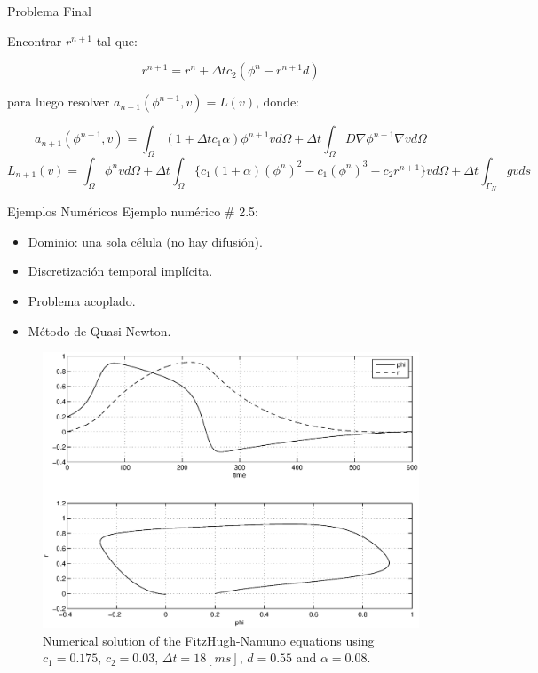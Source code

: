 \documentclass[11pt,spanish]{beamer}
\begin{document}
\begin{frame}{Problema Final}

Encontrar $r^{n+1}$ tal que:

\begin{equation*}
r^{n+1} = r^n + \Delta t c_2 (\phi^n - r^{n+1} d)
\end{equation*}

para luego resolver $a_{n + 1} (\phi^{n + 1}, v) = L(v)$, donde:

\begin{equation*}
a_{n+1} (\phi^{n + 1}, v) = \int_{\Omega} (1 + \Delta t c_1 \alpha) \phi^{n+1} v d \Omega + \Delta t \int_{\Omega} D \nabla \phi^{n+1} \nabla v d \Omega \label{eq:esquema_definitivo}
\end{equation*}
\begin{equation*}
L_{n+1}(v) = \int_{\Omega} \phi^n v d \Omega + \Delta t \int_\Omega \{ c_1(1 + \alpha)(\phi^n)^2 - c_1 (\phi^n)^3 - c_2 r^{n+1} \} v d \Omega + \Delta t \int_{\Gamma_N} g  v ds 
\end{equation*}
\end{frame}

\begin{frame}{Ejemplos Numéricos}
Ejemplo numérico \# 2.5:
\begin{itemize}
\item Dominio: una sola célula (no hay difusión).
\item Discretización temporal implícita.
\item Problema acoplado.
\item Método de Quasi-Newton.
\end{itemize}
\end{frame}

\begin{frame}
\begin{figure}[H]
\centering 
\includegraphics[height = 8.5 cm]{fig/reaction_term-FHN_implicit}
\caption{Numerical solution of the FitzHugh-Namuno equations using $c_1 = 0.175$, $c_2 = 0.03$, $\Delta t = 18 [ms]$, $d = 0.55$ and $\alpha = 0.08$.}
\end{figure}
\end{frame}
\end{document}
